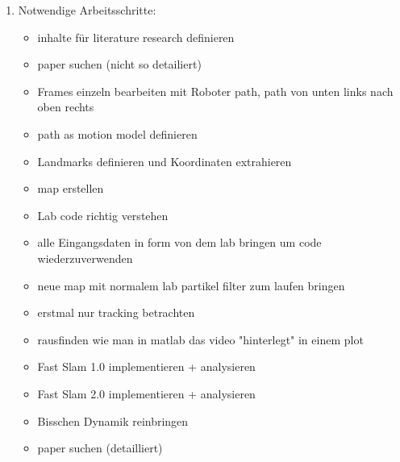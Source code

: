 \documentclass{article}
\begin{document}
\begin{enumerate}
	
	\item Notwendige Arbeitsschritte:
\begin{itemize}
	\item inhalte für literature research definieren
	\item paper suchen (nicht so detailiert)
	\item Frames einzeln bearbeiten mit Roboter path, path von unten links nach oben rechts
	\item path as motion model definieren
	\item Landmarks definieren und Koordinaten extrahieren
	\item map erstellen
	\item Lab code richtig verstehen
	\item alle Eingangsdaten in form von dem lab bringen um code wiederzuverwenden
	\item neue map mit normalem lab partikel filter zum laufen bringen
	\item erstmal nur tracking betrachten
	\item rausfinden wie man in matlab das video "hinterlegt" in einem plot
	\item Fast Slam 1.0 implementieren + analysieren
	\item Fast Slam 2.0 implementieren + analysieren
	\item Bisschen Dynamik reinbringen
	\item paper suchen (detailliert)	
	
\end{itemize}
	
\end{enumerate}
	
\end{document}

